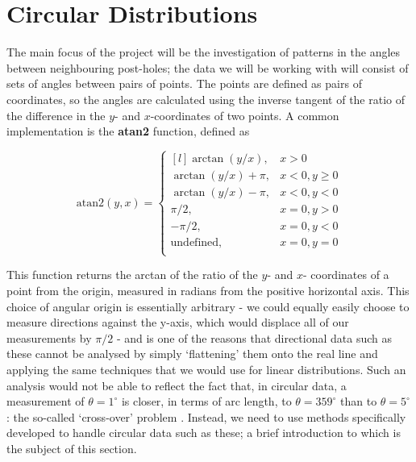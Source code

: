 \documentclass[../../ArchStats.tex]{subfiles}
\begin{document}





\section{Circular Distributions}

The main focus of the project will be the investigation of patterns in the angles between neighbouring post-holes; the data we will be working with will consist of sets of angles between pairs of points. The points are defined as pairs of coordinates, so the angles are calculated using the inverse tangent of the ratio of the difference in the $y$- and $x$-coordinates of two points. A common implementation is the \textbf{atan2} function, defined as

\begin{equation*}
\text{atan2} (y, x) = \left\lbrace \begin{matrix*}[l]
\arctan(y/x), & x > 0 \\
\arctan(y/x) + \pi, & x < 0, y \geq 0 \\
\arctan(y/x) - \pi, & x < 0, y < 0 \\
\pi/2, & x = 0, y > 0 \\
-\pi/2, & x = 0, y < 0 \\
\text{undefined}, & x = 0, y = 0 \\
\end{matrix*} \right. 
\end{equation*}

This function returns the arctan of the ratio of the $y$- and $x$- coordinates of a point from the origin, measured in radians from the positive horizontal axis. This choice of angular origin is essentially arbitrary - we could equally easily choose to measure directions against the y-axis, which would displace all of our measurements by $\pi/2$ - and is one of the reasons that directional  data such as these cannot be analysed by simply `flattening' them onto the real line and applying the same techniques that we would use for linear distributions. Such an analysis would not be able to reflect the fact that, in circular data, a measurement of $\theta = 1^\circ$ is closer, in terms of arc length, to $\theta = 359^\circ$ than to $\theta = 5^\circ$: the so-called `cross-over' problem \cite{Fisher1993}. Instead, we need to use methods specifically developed to handle circular data such as these; a brief introduction to which is the subject of this section. 
\end{document}
